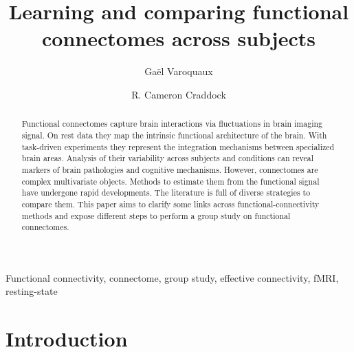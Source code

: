 \documentclass[5p]{elsarticle}
\begin{document}
\title{Learning and comparing functional connectomes across subjects}


\author[parietal,unicog,cea]{Ga\"el Varoquaux}
\author[cmi,nki]{R. Cameron Craddock}


\address[parietal]{Parietal project-team, INRIA Saclay-\^ile de France}
\address[unicog]{INSERM, U992}
\address[cea]{CEA/Neurospin b\^at 145, 91191 Gif-Sur-Yvette}
\address[cmi]{Child Mind Institute, New York, New York}
\address[nki]{Nathan Kline Institute for Psychiatric Research, Orangeburg, New York}

\begin{abstract}
    Functional connectomes capture brain interactions via 
    fluctuations in brain imaging signal. On rest data they map
    the intrinsic functional architecture of the brain. With
    task-driven experiments they represent the integration mechanisms
    between specialized brain areas. Analysis of their variability 
    across subjects and conditions can reveal markers of brain
    pathologies and cognitive mechanisms. However, connectomes are
    complex multivariate objects. Methods to estimate them 
    from the functional signal have undergone rapid developments.
    The literature is full of diverse strategies to compare them.
    This paper aims to clarify some links across functional-connectivity
    methods and expose different steps to perform a group study on
    functional connectomes.
\end{abstract}

\begin{keyword}
    Functional connectivity, connectome, group study, effective
    connectivity, fMRI, resting-state
\end{keyword}

\maketitle

\sloppy %

\section{Introduction}
\end{document}
